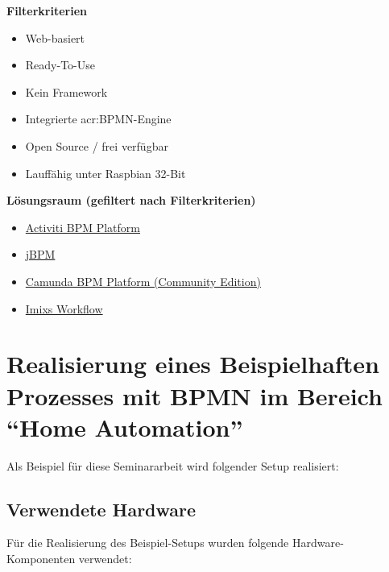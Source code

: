\textbf{Filterkriterien}
\begin{itemize}
\item Web-basiert
\item Ready-To-Use
\item Kein Framework
\item Integrierte \gls{acr:BPMN}-Engine
\item Open Source / frei verfügbar
\item Lauffähig unter Raspbian 32-Bit
\end{itemize}

\textbf{Lösungsraum (gefiltert nach Filterkriterien)}
\begin{itemize}
\item \hyperlink{http://activiti.org/}{Activiti BPM Platform}
\item \hyperlink{http://www.jbpm.org/}{jBPM}
\item \hyperlink{https://camunda.com/}{Camunda BPM Platform (Community Edition)}
\item \hyperlink{http://www.imixs.org/}{Imixs Workflow}
\end{itemize}



\section{Realisierung eines Beispielhaften Prozesses mit BPMN im Bereich "`Home Automation"'} \label{sec:AnalyseRPI:Beispiel}
Als Beispiel für diese Seminararbeit wird folgender Setup realisiert:


\subsection{Verwendete Hardware}
Für die Realisierung des Beispiel-Setups wurden folgende Hardware-Komponenten verwendet:
\begin{itemize}
\end{itemize}

